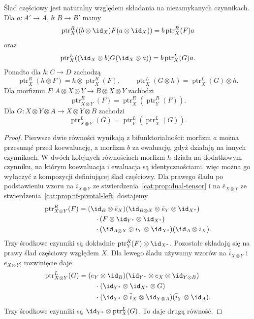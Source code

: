 \begin{stwierdzenie}\label{cat:prop:tf-partial-trace-laws}
Ślad częściowy jest naturalny względem składania na niezamykanych czynnikach. Dla $a:A'\to A$, $b:B\to B'$ mamy
\[
 \operatorname{ptr}^{R}_X((b\otimes\id_X)F(a\otimes\id_X))
 =b\operatorname{ptr}^{R}_X(F)a
\]
oraz
\[
 \operatorname{ptr}^{L}_X((\id_X\otimes b)G(\id_X\otimes a))
 =b\operatorname{ptr}^{L}_X(G)a.
\]
Ponadto dla $h:C\to D$ zachodzą
\[
 \operatorname{ptr}^{R}_X(h\otimes F)=h\otimes\operatorname{ptr}^{R}_X(F),
 \qquad
 \operatorname{ptr}^{L}_X(G\otimes h)=\operatorname{ptr}^{L}_X(G)\otimes h.
\]
Dla morfizmu
$F:A\otimes X\otimes Y\to B\otimes X\otimes Y$ zachodzi
\[
 \operatorname{ptr}^{R}_{X\otimes Y}(F)
 =\operatorname{ptr}^{R}_X(\operatorname{ptr}^{R}_Y(F)).
\]
Dla $G:X\otimes Y\otimes A\to X\otimes Y\otimes B$ zachodzi
\[
 \operatorname{ptr}^{L}_{X\otimes Y}(G)
 =\operatorname{ptr}^{L}_Y(\operatorname{ptr}^{L}_X(G)).
\]
\end{stwierdzenie}
\begin{proof}
Pierwsze dwie równości wynikają z bifunktorialności: morfizm $a$ można przesunąć przed koewaluację, a morfizm $b$ za ewaluację, gdyż działają na innych czynnikach. W dwóch kolejnych równościach morfizm $h$ działa na dodatkowym czynniku, na którym koewaluacja i ewaluacja są identycznościami, więc można go wyłączyć z kompozycji definiującej ślad częściowy. Dla prawego śladu po podstawieniu wzoru na $i_{X\otimes Y}$ ze stwierdzenia~\ref{cat:prop:dual-tensor} i na $\bar e_{X\otimes Y}$ ze stwierdzenia~\ref{cat:prop:tf-pivotal-left} dostajemy
\[
\begin{aligned}
 \operatorname{ptr}^{R}_{X\otimes Y}(F)
 ={}&(\id_B\otimes\bar e_X)
 (\id_{B\otimes X}\otimes\bar e_Y\otimes\id_{X^*})\\
 &\quad\cdot(F\otimes\id_{Y^*}\otimes\id_{X^*})\\
 &\quad\cdot(\id_{A\otimes X}\otimes i_Y\otimes\id_{X^*})
 (\id_A\otimes i_X).
\end{aligned}
\]
Trzy środkowe czynniki są dokładnie $\operatorname{ptr}^{R}_Y(F)\otimes\id_{X^*}$. Pozostałe składają się na prawy ślad częściowy względem $X$. Dla lewego śladu używamy wzorów na $\bar i_{X\otimes Y}$ i $e_{X\otimes Y}$; rozwinięcie daje
\[
\begin{aligned}
 \operatorname{ptr}^{L}_{X\otimes Y}(G)
 ={}&(e_Y\otimes\id_B)
 (\id_{Y^*}\otimes e_X\otimes\id_{Y\otimes B})\\
 &\quad\cdot(\id_{Y^*}\otimes\id_{X^*}\otimes G)\\
 &\quad\cdot(\id_{Y^*}\otimes\bar i_X\otimes\id_{Y\otimes A})
 (\bar i_Y\otimes\id_A).
\end{aligned}
\]
Trzy środkowe czynniki są $\id_{Y^*}\otimes\operatorname{ptr}^{L}_X(G)$. To daje drugą równość.
\end{proof}

